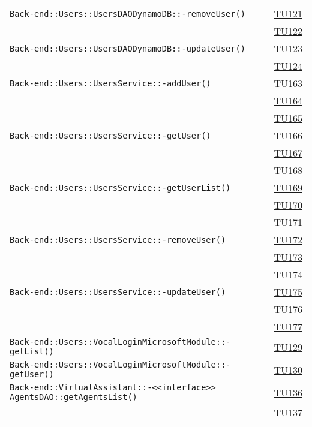 \begin{longtable}{|>{\centering}m{12cm}|m{1cm}<{\centering}|}
\texttt{Back-end::Users::UsersDAODynamoDB::-\linebreak removeUser()} & \hyperlink{TU121}{TU121}\\ & \hyperlink{TU122}{TU122}\\ \hline
\texttt{Back-end::Users::UsersDAODynamoDB::-\linebreak updateUser()} & \hyperlink{TU123}{TU123}\\ & \hyperlink{TU124}{TU124}\\ \hline
\texttt{Back-end::Users::UsersService::-\linebreak addUser()} & \hyperlink{TU163}{TU163}\\ & \hyperlink{TU164}{TU164}\\ & \hyperlink{TU165}{TU165}\\ \hline
\texttt{Back-end::Users::UsersService::-\linebreak getUser()} & \hyperlink{TU166}{TU166}\\ & \hyperlink{TU167}{TU167}\\ & \hyperlink{TU168}{TU168}\\ \hline
\texttt{Back-end::Users::UsersService::-\linebreak getUserList()} & \hyperlink{TU169}{TU169}\\ & \hyperlink{TU170}{TU170}\\ & \hyperlink{TU171}{TU171}\\ \hline
\texttt{Back-end::Users::UsersService::-\linebreak removeUser()} & \hyperlink{TU172}{TU172}\\ & \hyperlink{TU173}{TU173}\\ & \hyperlink{TU174}{TU174}\\ \hline
\texttt{Back-end::Users::UsersService::-\linebreak updateUser()} & \hyperlink{TU175}{TU175}\\ & \hyperlink{TU176}{TU176}\\ & \hyperlink{TU177}{TU177}\\ \hline
\texttt{Back-end::Users::VocalLoginMicrosoftModule::-\linebreak getList()} & \hyperlink{TU129}{TU129}\\ \hline
\texttt{Back-end::Users::VocalLoginMicrosoftModule::-\linebreak getUser()} & \hyperlink{TU130}{TU130}\\ \hline
\texttt{Back-end::VirtualAssistant::-\linebreak <<interface>> AgentsDAO::getAgentsList()} & \hyperlink{TU136}{TU136}\\ & \hyperlink{TU137}{TU137}\\ \hline

\end{longtable}
